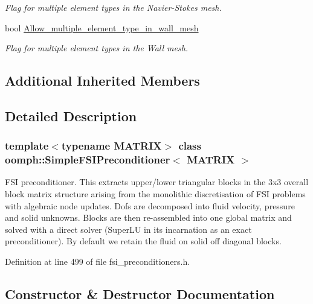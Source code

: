 \begin{DoxyCompactItemize}
\begin{DoxyCompactList}\small\item\em Flag for multiple element types in the Navier-\/\+Stokes mesh. \end{DoxyCompactList}\item 
bool \hyperlink{classoomph_1_1SimpleFSIPreconditioner_a70094cbfae8c30e11647906cdd7e38c3}{Allow\+\_\+multiple\+\_\+element\+\_\+type\+\_\+in\+\_\+wall\+\_\+mesh}
\begin{DoxyCompactList}\small\item\em Flag for multiple element types in the Wall mesh. \end{DoxyCompactList}\end{DoxyCompactItemize}
\subsection*{Additional Inherited Members}


\subsection{Detailed Description}
\subsubsection*{template$<$typename M\+A\+T\+R\+IX$>$\newline
class oomph\+::\+Simple\+F\+S\+I\+Preconditioner$<$ M\+A\+T\+R\+I\+X $>$}

F\+SI preconditioner. This extracts upper/lower triangular blocks in the 3x3 overall block matrix structure arising from the monolithic discretisation of F\+SI problems with algebraic node updates. Dofs are decomposed into fluid velocity, pressure and solid unknowns. Blocks are then re-\/assembled into one global matrix and solved with a direct solver (Super\+LU in its incarnation as an exact preconditioner). By default we retain the fluid on solid off diagonal blocks. 

Definition at line 499 of file fsi\+\_\+preconditioners.\+h.



\subsection{Constructor \& Destructor Documentation}
\mbox{\label{classoomph_1_1SimpleFSIPreconditioner_a597c5d3292b1e5e9001f8a738f186a73}} 
